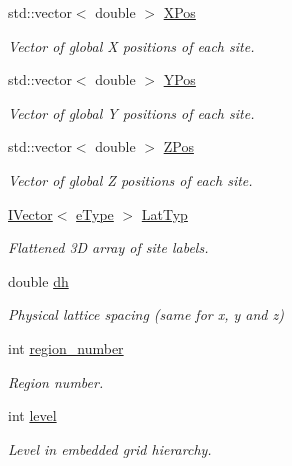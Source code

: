 \begin{DoxyCompactItemize}
\item 
std\+::vector$<$ double $>$ \hyperlink{class_grid_obj_af31df133bf9419da6222a0dbb4e54bab}{X\+Pos}
\begin{DoxyCompactList}\small\item\em Vector of global X positions of each site. \end{DoxyCompactList}\item 
std\+::vector$<$ double $>$ \hyperlink{class_grid_obj_a2bd4e9b575377b8e76e5ebe7a3a31194}{Y\+Pos}
\begin{DoxyCompactList}\small\item\em Vector of global Y positions of each site. \end{DoxyCompactList}\item 
std\+::vector$<$ double $>$ \hyperlink{class_grid_obj_af859d35bf0a03cee8965ce3e22e651c6}{Z\+Pos}
\begin{DoxyCompactList}\small\item\em Vector of global Z positions of each site. \end{DoxyCompactList}\item 
\hyperlink{class_i_vector}{I\+Vector}$<$ \hyperlink{_grid_obj_8h_a12f8ec8f0e7a4584b9fe481bb53fa60e}{e\+Type} $>$ \hyperlink{class_grid_obj_a8ce077fba648f767361039eb924c45ae}{Lat\+Typ}
\begin{DoxyCompactList}\small\item\em Flattened 3D array of site labels. \end{DoxyCompactList}\item 
double \hyperlink{class_grid_obj_a4efe4f79d600da2f459a0cc08b89b40c}{dh}
\begin{DoxyCompactList}\small\item\em Physical lattice spacing (same for x, y and z) \end{DoxyCompactList}\item 
int \hyperlink{class_grid_obj_ae0b724f2d977cfe38df2bb191e2fb042}{region\+\_\+number}
\begin{DoxyCompactList}\small\item\em Region number. \end{DoxyCompactList}\item 
int \hyperlink{class_grid_obj_a7dfedc4442a386ec15c8b03ca899c1a9}{level}
\begin{DoxyCompactList}\small\item\em Level in embedded grid hierarchy. \end{DoxyCompactList}\item 

\end{DoxyCompactItemize}
